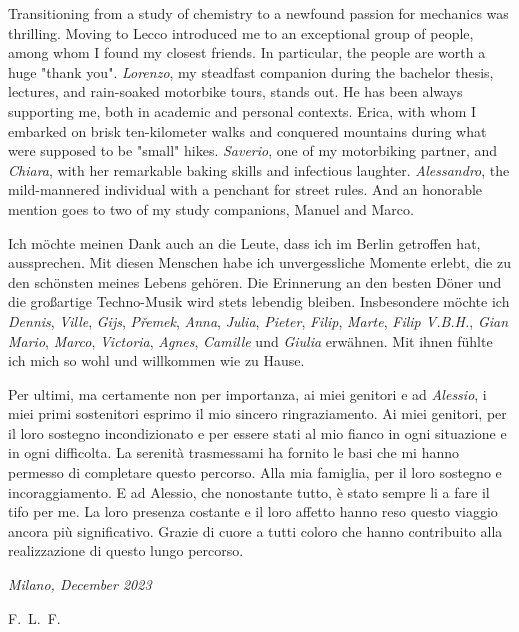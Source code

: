 \documentclass{Configuration_Files/PoliMi3i_thesis}
\begin{document}
Transitioning from a study of chemistry to a newfound passion for mechanics was thrilling. Moving to Lecco introduced me to an exceptional group of people, among whom I found my closest friends. In particular, the people are worth a huge "thank you". \textit{Lorenzo}, my steadfast companion during the bachelor thesis, lectures, and rain-soaked motorbike tours, stands out. He has been always supporting me, both in academic and personal contexts. Erica, with whom I embarked on brisk ten-kilometer walks and conquered mountains during what were supposed to be "small" hikes. \textit{Saverio}, one of my motorbiking partner, and \textit{Chiara}, with her remarkable baking skills and infectious laughter. \textit{Alessandro}, the mild-mannered individual with a penchant for street rules. And an honorable mention goes to two of my study companions, Manuel and Marco.

Ich möchte meinen Dank auch an die Leute, dass ich im Berlin getroffen hat, aussprechen. Mit diesen Menschen habe ich unvergessliche Momente erlebt, die zu den schönsten meines Lebens gehören. Die Erinnerung an den besten Döner und die großartige Techno-Musik wird stets lebendig bleiben. Insbesondere möchte ich \textit{Dennis}, \textit{Ville}, \textit{Gijs}, \textit{P\v{r}emek}, \textit{Anna}, \textit{Julia}, \textit{Pieter}, \textit{Filip}, \textit{Marte}, \textit{Filip V.B.H.}, \textit{Gian Mario}, \textit{Marco}, \textit{Victoria}, \textit{Agnes}, \textit{Camille} und \textit{Giulia} erwähnen. Mit ihnen fühlte ich mich so wohl und willkommen wie zu Hause.

Per ultimi, ma certamente non per importanza, ai miei genitori e ad \textit{Alessio}, i miei primi sostenitori esprimo il mio sincero ringraziamento. Ai miei genitori, per il loro sostegno incondizionato e per essere stati al mio fianco in ogni situazione e in ogni difficolta. La serenità trasmessami ha fornito le basi che mi hanno permesso di completare questo percorso. Alla mia famiglia, per il loro sostegno e incoraggiamento. E ad Alessio, che nonostante tutto, è stato sempre li a fare il tifo per me. La loro presenza costante e il loro affetto hanno reso questo viaggio ancora più significativo. Grazie di cuore a tutti coloro che hanno contribuito alla realizzazione di questo lungo percorso.

\noindent\textit{Milano, December 2023}

\begin{flushright}
    \hfill F.~L.~F.
\end{flushright}

\cleardoublepage
\end{document}
